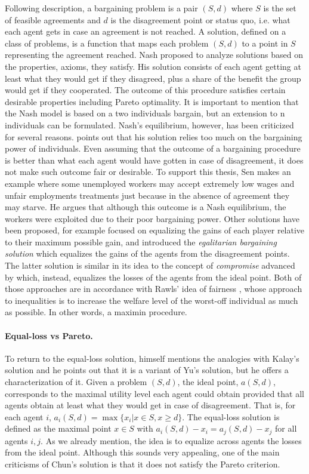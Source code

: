 Following \citet{Nash1950} description, a bargaining problem is a pair $(S,d)$ where $S$ is the set of feasible agreements and $d$ is the disagreement point or status quo, i.e. what each agent gets in case an agreement is not reached. A solution, defined on a class of problems, is a function that maps each problem $(S,d)$ to a point in $S$ representing the agreement reached.
Nash proposed to analyze solutions based on the properties, axioms, they satisfy. His solution consists of each agent getting at least what they would get if they disagreed, plus a share of the benefit the group would get if they cooperated. The outcome of this procedure satisfies certain desirable properties including Pareto optimality. It is important to mention that the Nash model is based on a two individuals bargain, but an extension to n individuals can be formulated. Nash's equilibrium, however, has been criticized for several reasons. \citet[pp. 177-180]{Sen2017} points out that his solution relies too much on the bargaining power of individuals.
Even assuming that the outcome of a bargaining procedure is better than what each agent would have gotten in case of disagreement, it does not make such outcome fair or desirable. To support this thesis, Sen makes an example where some unemployed workers may accept extremely low wages and unfair employments treatments just because in the absence of agreement they may starve. He argues that although this outcome is a Nash equilibrium, the workers were exploited due to their poor bargaining power.
Other solutions have been proposed, for example \citet{Kalai1975} focused on equalizing the gains of each player relative to their maximum possible gain, and \citet{Kalai1977} introduced the \textit{egalitarian bargaining solution} which equalizes the gains of the agents from the disagreement points. 
The latter solution is similar in its idea to the concept of \textit{compromise} advanced by \citet{Yu1973} which, instead, equalizes the losses of the agents from the ideal point.
Both of those approaches are in accordance with Rawls' idea of fairness \citep{Rawls1958,Rawls1967}, whose approach to inequalities is to increase the welfare level of the worst-off individual as much as possible. In other words, a maximin procedure.

\paragraph{Equal-loss vs Pareto.} To return to the equal-loss solution, \citet{Chun1988} himself mentions the analogies with Kalay's solution and he points out that it is a variant of Yu's solution, but he offers a characterization of it.
Given a problem $(S,d)$, the ideal point, $a(S,d)$, corresponds to the maximal utility level each agent could obtain provided that all agents obtain at least what they would get in case of disagreement. That is, for each agent $i$, $a_i(S,d)=\max\{x_i|x\in S, x\geq d\}$.
The equal-loss solution is defined as the maximal point $x\in S$ with $a_i(S,d)-x_i=a_j(S,d)-x_j$ for all agents $i, j$. As we already mention, the idea is to equalize across agents the losses from the ideal point.
Although this sounds very appealing, one of the main criticisms of Chun's solution is that it does not satisfy the Pareto criterion. 

